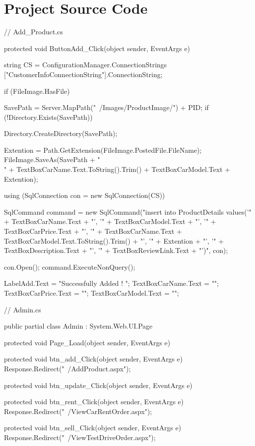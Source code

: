 \chapter{Project Source Code}

\begin{spverbatim}
// Add_Product.cs

 protected void ButtonAdd_Click(object sender, EventArgs e)
    {


        string CS = ConfigurationManager.ConnectionStrings
["CustomerInfoConnectionString"].ConnectionString;

        if (FileImage.HasFile)
        {
            SavePath = Server.MapPath("~/Images/ProductImage/") + PID;
            if (!Directory.Exists(SavePath))
            {
                Directory.CreateDirectory(SavePath);

            }
            Extention = Path.GetExtension(FileImage.PostedFile.FileName);
            FileImage.SaveAs(SavePath + "\\" + TextBoxCarName.Text.ToString().Trim() + TextBoxCarModel.Text + Extention);


        }


        using (SqlConnection con = new SqlConnection(CS))
        {
            SqlCommand command = new SqlCommand("insert into ProductDetails values('" + TextBoxCarName.Text + "', '" + TextBoxCarModel.Text + "', '" + TextBoxCarPrice.Text + "', '" + TextBoxCarName.Text + TextBoxCarModel.Text.ToString().Trim() + "', '" + Extention + "', '" + TextBoxDescription.Text + "', '" + TextBoxReviewLink.Text + "')", con);

            con.Open();
            command.ExecuteNonQuery();

            LabelAdd.Text = "Successfully Added ! ";
            TextBoxCarName.Text = "";
            TextBoxCarPrice.Text = "";
            TextBoxCarModel.Text = "";
            

        }


    }
\end{spverbatim}

\begin{spverbatim}

// Admin.cs

public partial class Admin : System.Web.UI.Page
{
    protected void Page_Load(object sender, EventArgs e)
    {

    }

    protected void btn_add_Click(object sender, EventArgs e)
    {
        Response.Redirect("~/AddProduct.aspx");
    }

    protected void btn_update_Click(object sender, EventArgs e)
    {

    }

    protected void btn_rent_Click(object sender, EventArgs e)
    {
        Response.Redirect("~/ViewCarRentOrder.aspx");
    }

    protected void btn_sell_Click(object sender, EventArgs e)
    {
        Response.Redirect("~/ViewTestDriveOrder.aspx");
    }
}
\end{spverbatim}

